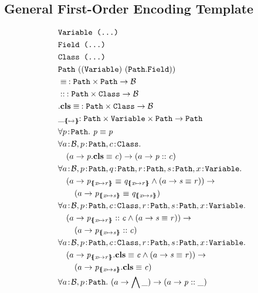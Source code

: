 \documentclass[a4paper]{article}
\begin{document}
\subsection{General First-Order Encoding Template}
\begin{align}
  &\texttt{\Variable~(...)}\\
  &\texttt{\Field~(...)}\\
  &\texttt{\Class~(...)}\\
  &\Path~((\Variable)~(\Path.\Field))\\
  &\pathEq{}{}\!\!: \Path \times \Path \rightarrow \TBool \\
  &\instOf{}{}\!\!: \Path \times \Class \rightarrow \TBool\\
  &\instBy{}{}\!\!: \Path \times \Class \rightarrow \TBool\\
  &{\_}_{\sub{}{}}\!\!: \Path \times \Variable \times \Path \rightarrow \Path\\
  &\forall \sortedVar{p}{\Path}.~\pathEq{p}{p}\\
  &\forall \sortedVar{a}{\TBool}, \sortedVar{p}{\Path}, \sortedVar{c}{\Class}.\\
  &\quad(a \rightarrow \instBy{p}{c}) \rightarrow (a \rightarrow \instOf{p}{c})\\
  &\forall \sortedVar{a}{\TBool}, \sortedVar{p}{\Path}, \sortedVar{q}{\Path}, \sortedVar{r}{\Path}, \sortedVar{s}{\Path}, \sortedVar{x}{\Variable}.\\
  &\quad (a \rightarrow \pathEq{p_{\sub{x}{r}}}{q_{\sub{x}{r}}} \land (a \rightarrow \pathEq{s}{r})) \rightarrow\\
  &\qquad (a \rightarrow \pathEq{p_{\sub{x}{s}}}{q_{\sub{x}{s}}})\\
  &\forall \sortedVar{a}{\TBool}, \sortedVar{p}{\Path}, \sortedVar{c}{\Class}, \sortedVar{r}{\Path}, \sortedVar{s}{\Path}, \sortedVar{x}{\Variable}.\\
  &\quad (a \rightarrow \instOf{p_{\sub{x}{r}}}{c} \land (a \rightarrow \pathEq{s}{r})) \rightarrow\\
  &\qquad (a \rightarrow \instOf{p_{\sub{x}{s}}}{c})\\
  &\forall \sortedVar{a}{\TBool}, \sortedVar{p}{\Path}, \sortedVar{c}{\Class}, \sortedVar{r}{\Path}, \sortedVar{s}{\Path}, \sortedVar{x}{\Variable}.\\
  &\quad (a \rightarrow \instBy{p_{\sub{x}{r}}}{c} \land (a \rightarrow \pathEq{s}{r})) \rightarrow\\
  &\qquad (a \rightarrow \instBy{p_{\sub{x}{s}}}{c})\\
  &\forall \sortedVar{a}{\TBool}, \sortedVar{p}{\Path}.~(a \rightarrow \bigwedge \hole) \rightarrow (a \rightarrow \instOf{p}{\hole})
\end{align}
\end{document}
